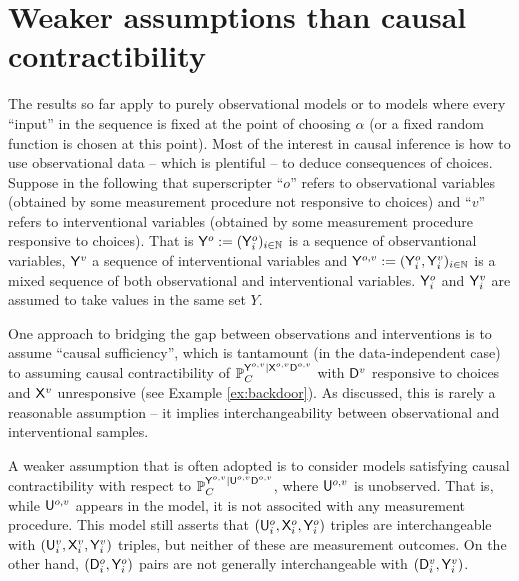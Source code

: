 \section{Weaker assumptions than causal contractibility}\label{sec:weaker_assumptions}

The results so far apply to purely observational models or to models where every ``input'' in the sequence is fixed at the point of choosing $\alpha$ (or a fixed random function is chosen at this point). Most of the interest in causal inference is how to use observational data -- which is plentiful -- to deduce consequences of choices. Suppose in the following that superscripter ``$o$'' refers to observational variables (obtained by some measurement procedure not responsive to choices) and ``$v$'' refers to interventional variables (obtained by some measurement procedure responsive to choices). That is $\mathsf{Y}^o:=(\mathsf{Y}_i^o)_{i\in \mathbb{N}}$ is a sequence of observantional variables, $\mathsf{Y}^v$ a sequence of interventional variables and $\mathsf{Y}^{o,v}:=(\mathsf{Y}^o_i,\mathsf{Y}^v_i)_{i\in\mathbb{N}}$ is a mixed sequence of both observational and interventional variables. $\mathsf{Y}_i^o$ and $\mathsf{Y}_i^v$ are assumed to take values in the same set $Y$.

One approach to bridging the gap between observations and interventions is to assume ``causal sufficiency'', which is tantamount (in the data-independent case) to assuming causal contractibility of $\mathbb{P}_C^{\mathsf{Y}^{o,v}|\mathsf{X}^{o,v}\mathsf{D}^{o,v}}$ with $\mathsf{D}^v$ responsive to choices and $\mathsf{X}^v$ unresponsive (see Example \ref{ex:backdoor}). As discussed, this is rarely a reasonable assumption -- it implies interchangeability between observational and interventional samples.

A weaker assumption that is often adopted is to consider models satisfying causal contractibility with respect to $\mathbb{P}_C^{\mathsf{Y}^{o,v}|\mathsf{U}^{o,v}\mathsf{D}^{o,v}}$, where $\mathsf{U}^{o,v}$ is unobserved. That is, while $\mathsf{U}^{o,v}$ appears in the model, it is not associted with any measurement procedure. This model still asserts that $(\mathsf{U}^o_i,\mathsf{X}^o_i,\mathsf{Y}^o_i)$ triples are interchangeable with $(\mathsf{U}^v_i,\mathsf{X}^v_i,\mathsf{Y}^v_i)$ triples, but neither of these are measurement outcomes. On the other hand, $(\mathsf{D}_i^o,\mathsf{Y}_i^o)$ pairs are not generally interchangeable with $(\mathsf{D}_i^v,\mathsf{Y}_i^v)$.

